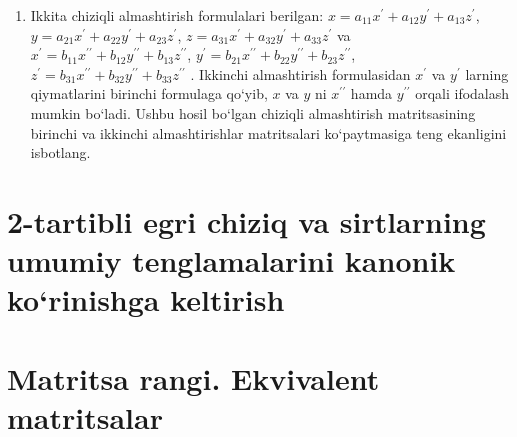 \begin{enumerate}
\item Ikkita chiziqli almashtirish formulalari berilgan: $x=a_{11}x^\prime+a_{12}y^\prime+a_{13}z^\prime$, $y=a_{21}x^\prime+a_{22}y^\prime+a_{23}z^\prime$,
$z=a_{31}x^\prime+a_{32}y^\prime+a_{33}z^\prime$
va 
$x^\prime=b_{11}x^{\prime\prime}+b_{12}y^{\prime\prime}+b_{13}z^{\prime\prime}$,
$y^\prime=b_{21}x^{\prime\prime}+b_{22}y^{\prime\prime}+b_{23}z^{\prime\prime}$,
$z^\prime=b_{31}x^{\prime\prime}+b_{32}y^{\prime\prime}+b_{33}z^{\prime\prime}$
. Ikkinchi almashtirish formulasidan $x^\prime$ va $y^\prime$ larning qiymatlarini birinchi formulaga qo`yib, $x$ va $y$ ni $x^{\prime\prime}$ hamda $y^{\prime\prime}$ orqali ifodalash mumkin bo`ladi. Ushbu hosil bo`lgan chiziqli almashtirish matritsasining birinchi va ikkinchi almashtirishlar matritsalari ko`paytmasiga teng ekanligini isbotlang.
\end{enumerate}

\section{2-tartibli egri chiziq va sirtlarning umumiy tenglamalarini kanonik ko`rinishga keltirish}
\section{Matritsa rangi. Ekvivalent matritsalar}



